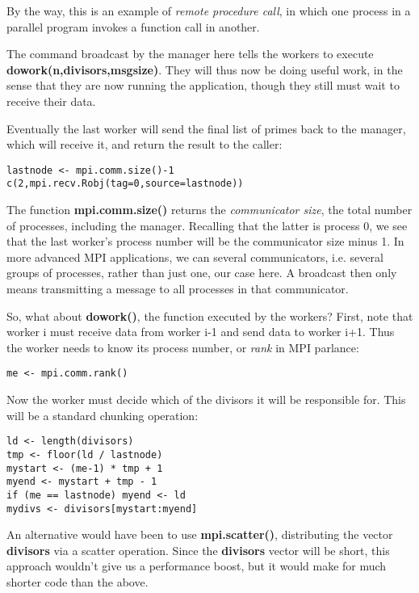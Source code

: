 By the way, this is an example of {\it remote procedure call}, in which
one process in a parallel program invokes a function call in another.

The command broadcast by the manager here tells the workers to execute
{\bf dowork(n,divisors,msgsize)}.  They will thus now be doing useful
work, in the sense that they are now running the application, though
they still must wait to receive their data.

Eventually the last worker will send the final list of primes back to
the manager, which will receive it, and return the result to the caller:

\begin{lstlisting}
lastnode <- mpi.comm.size()-1
c(2,mpi.recv.Robj(tag=0,source=lastnode))
\end{lstlisting}

The function {\bf mpi.comm.size()} returns the {\it communicator size},
the total number of processes, including the manager.  Recalling that
the latter is process 0, we see that the last worker's process number
will be the communicator size minus 1.  In more advanced MPI
applications, we can several communicators, i.e. several groups of
processes, rather than just one, our case here.  A broadcast then only
means transmitting a message to all processes in that communicator.

So, what about {\bf dowork()}, the function executed by the workers?
First, note that worker i must receive data from worker i-1 and send
data to worker i+1.  Thus the worker needs to know its process number,
or {\it rank} in MPI parlance:

\begin{lstlisting}
me <- mpi.comm.rank()
\end{lstlisting}

Now the worker must decide which of the divisors it will be responsible
for.  This will be a standard chunking operation:

\begin{lstlisting}
ld <- length(divisors)
tmp <- floor(ld / lastnode)
mystart <- (me-1) * tmp + 1
myend <- mystart + tmp - 1
if (me == lastnode) myend <- ld
mydivs <- divisors[mystart:myend]
\end{lstlisting}

An alternative would have been to use {\bf mpi.scatter()}, distributing
the vector {\bf divisors} via a scatter operation.  Since the {\bf
divisors} vector will be short, this approach wouldn't give us a
performance boost, but it would make for much shorter code than the
above.

